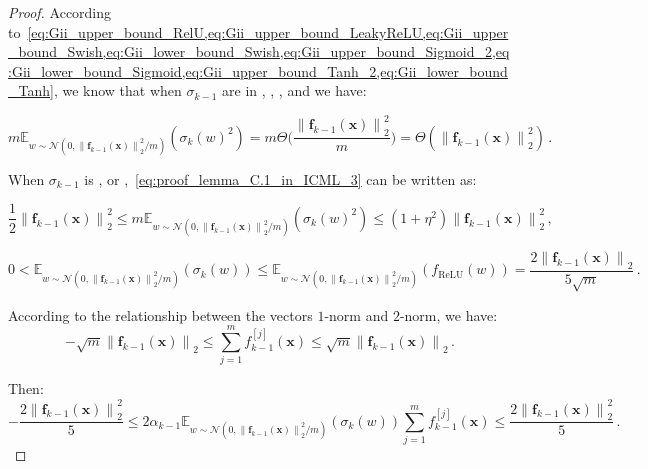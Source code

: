 \documentclass[nohyperref]{article}
\theoremstyle{plain}
\theoremstyle{definition}
\theoremstyle{remark}
\begin{document}
\begin{proof}
According to~\cref{eq:Gii_upper_bound_RelU,eq:Gii_upper_bound_LeakyReLU,eq:Gii_upper_bound_Swish,eq:Gii_lower_bound_Swish,eq:Gii_upper_bound_Sigmoid_2,eq:Gii_lower_bound_Sigmoid,eq:Gii_upper_bound_Tanh_2,eq:Gii_lower_bound_Tanh}, we know that when $\sigma_{k-1}$ are in , , ,  and  we have:


\begin{equation}
m\mathbb{E}_{w\sim \mathcal N(0,\left \| \bm{f}_{k-1}(\bm{x}) \right \|_2^2/m )}(\sigma_k(w)^2) = m\Theta \bigg(\frac{\left \| \bm{f}_{k-1}(\bm{x}) \right \|_2^2}{m}\bigg) = \Theta(\left \| \bm{f}_{k-1}(\bm{x}) \right \|_2^2)\,.
\label{eq:proof_lemma_C.1_in_ICML_3}
\end{equation}


When $\sigma_{k-1}$ is ,  or ,~\cref{eq:proof_lemma_C.1_in_ICML_3} can be written as:

\begin{equation*}
\frac{1}{2}\left \| \bm{f}_{k-1}(\bm{x}) \right \|_2^2 \leq m\mathbb{E}_{w\sim \mathcal N(0,\left \| \bm{f}_{k-1}(\bm{x}) \right \|_2^2/m )}(\sigma_k(w)^2) \leq (1+\eta^2)\left \| \bm{f}_{k-1}(\bm{x}) \right \|_2^2\,,
\end{equation*}


\begin{equation*}
0<\mathbb{E}_{w\sim \mathcal N(0,\left \| \bm{f}_{k-1}(\bm{x}) \right \|_2^2/m )}(\sigma_k(w))\leq\mathbb{E}_{w\sim \mathcal N(0,\left \| \bm{f}_{k-1}(\bm{x}) \right \|_2^2/m )}(f_{\mathrm{ReLU}}(w))=\frac{2\left \| \bm{f}_{k-1}(\bm{x}) \right \|_2}{5\sqrt{m}}\,.
\end{equation*}

According to the relationship between the vectors $1$-norm and $2$-norm, we have:
\begin{equation*}
-\sqrt{m}\left \| \bm{f}_{k-1}(\bm{x}) \right \|_2\leq\sum_{j = 1}^{m}f_{k-1}^{[j]}(\bm{x})\leq \sqrt{m}\left \| \bm{f}_{k-1}(\bm{x}) \right \|_2\,.
\end{equation*}

Then:
\begin{equation*}
-\frac{2\left \| \bm{f}_{k-1}(\bm{x}) \right \|_2^2}{5}\leq2\alpha_{k-1}\mathbb{E}_{w\sim \mathcal N(0,\left \| \bm{f}_{k-1}(\bm{x}) \right \|_2^2/m )}(\sigma_k(w))\sum_{j = 1}^{m}f_{k-1}^{[j]}(\bm{x})\leq \frac{2\left \| \bm{f}_{k-1}(\bm{x}) \right \|_2^2}{5}\,.
\end{equation*}


\end{proof}
\end{document}
